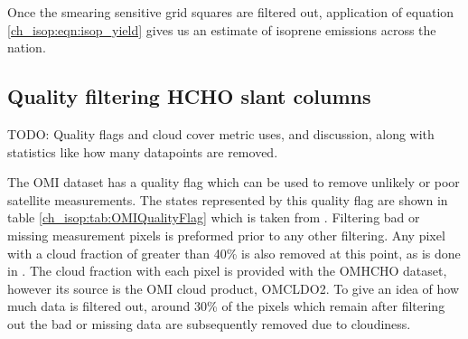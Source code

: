     Once the smearing sensitive grid squares are filtered out, application of equation \ref{ch_isop:eqn:isop_yield} gives us an estimate of isoprene emissions across the nation.

  \subsection{Quality filtering HCHO slant columns}
    TODO: Quality flags and cloud cover metric uses, and discussion, along with statistics like how many datapoints are removed.
    
    The OMI dataset has a quality flag which can be used to remove unlikely or poor satellite measurements.
    The states represented by this quality flag are shown in table \ref{ch_isop:tab:OMIQualityFlag} which is taken from \citet{OMI_Readme}.
    Filtering bad or missing measurement pixels is preformed prior to any other filtering.
    Any pixel with a cloud fraction of greater than 40\% is also removed at this point, as is done in \citet{Gonzalez2015, DeSmedt2015}.
    The cloud fraction with each pixel is provided with the OMHCHO dataset, however its source is the OMI cloud product, OMCLDO2.
    To give an idea of how much data is filtered out, around 30\% of the pixels which remain after filtering out the bad or missing data are subsequently removed due to cloudiness.
    
